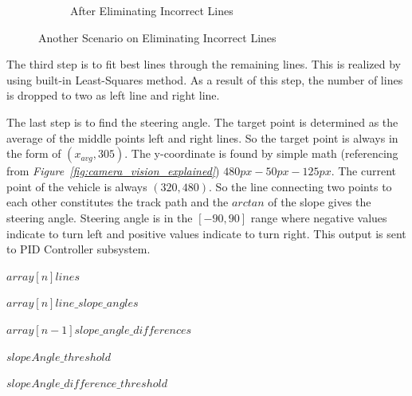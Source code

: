 \documentclass[a4paper,12pt]{article}
\begin{document}
\begin{enumerate}[A.]
\begin{figure}[t!]
\begin{subfigure}{.46\textwidth}
\caption{\label{fig:dataP_explained4} After Eliminating Incorrect Lines}

\end{subfigure}

\caption{\label{fig:dataP_explainedBroken} Another Scenario on Eliminating Incorrect Lines}

\end{figure}

The third step is to fit best lines through the remaining lines. This is realized by using built-in Least-Squares method. As a result of this step, the number of lines is dropped to two as left line and right line.


The last step is to find the steering angle. The target point is determined as the average of the middle points left and right lines. So the target point is always in the form of $(x_{avg}, 305)$. The y-coordinate is found by simple math (referencing from \textit{Figure~\ref{fig:camera_vision_explained}}) $480px-50px-125px$. The current point of the vehicle is always $(320,480)$. So the line connecting two points to each other constitutes the track path and the $arctan$ of the slope gives the steering angle. Steering angle is in the $[-90,90]$ range where negative values indicate to turn left and positive values indicate to turn right. This output is sent to PID Controller subsystem.
\begin{algorithm}[t]
	
	
	
	\DontPrintSemicolon
	
	
	$array[n] lines $\;
	
	$array[n] line\_slope\_angles $\;
	
	$array[n-1] slope\_angle\_differences$ \;
	
	
	$slopeAngle\_threshold $\;
	
	$slopeAngle\_difference\_threshold$ \;
	
	
	
\end{algorithm}
\end{enumerate}
\end{document}
